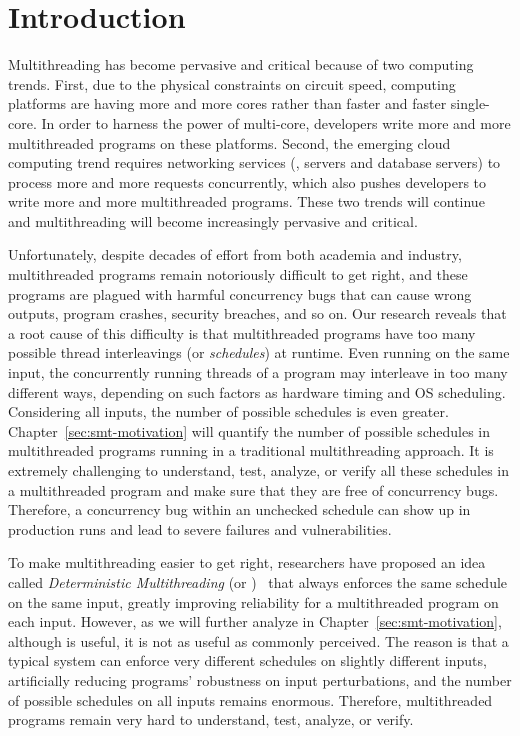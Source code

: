 \chapter{Introduction} \label{sec:intro}

Multithreading has become pervasive and critical because of two computing
trends. First, due to the physical constraints on circuit speed, computing
platforms are having more and more cores rather than faster and faster
single-core. In order to harness the power of multi-core, developers write more
and more multithreaded programs on these platforms. Second, the emerging cloud
computing trend requires networking services (\eg, \http servers and database
servers) to process more and more requests concurrently, which also pushes
developers to write more and more multithreaded programs. These two trends will
continue and multithreading will become increasingly pervasive and critical.

Unfortunately, despite decades of effort from both academia and industry,
multithreaded programs remain notoriously difficult to get right, and these
programs are plagued with harmful concurrency bugs that can cause wrong outputs,
program crashes, security breaches, and so on. Our research reveals that a root
cause of this difficulty is that multithreaded programs have too many
possible thread interleavings (or \emph{schedules}) at runtime. Even running on 
the same input, the concurrently running threads of a program may interleave in 
too many different ways, depending on such factors as hardware timing and OS
scheduling. Considering all inputs, the number of possible schedules is even
greater. Chapter~\ref{sec:smt-motivation} will quantify the number of
possible schedules in multithreaded programs running in a traditional
multithreading approach. It is extremely challenging to understand, test, 
analyze, or verify all these schedules in a multithreaded program and 
make sure that they are free of concurrency bugs. Therefore, a concurrency bug 
within an unchecked schedule can show up in production runs and lead to severe 
failures and vulnerabilities.

To make multithreading easier to get right, researchers have proposed an idea 
called \emph{Deterministic Multithreading} (or 
\emph{\dmt})~\cite{dthreads:sosp11, dpj:oopsla09, dmp:asplos09, kendo:asplos09, 
coredet:asplos10} that always enforces the same schedule on the same input, 
greatly improving reliability for a multithreaded program on each input. 
However, as we will further analyze in
Chapter~\ref{sec:smt-motivation}, although \dmt is useful, it is not as useful
as commonly perceived. The reason is that a typical \dmt system can enforce
very different schedules on slightly different inputs, artificially reducing
programs' robustness on input perturbations, and the number of possible
schedules on all inputs remains enormous. Therefore, multithreaded programs
remain very hard to understand, test, analyze, or verify.

